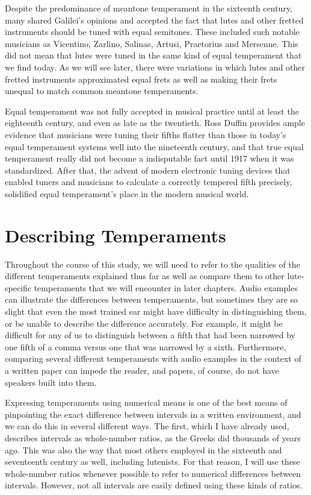 Despite the predominance of meantone temperament in the sixteenth century, many shared
Galilei's opinions and accepted the fact that lutes and other fretted instruments should
be tuned with equal semitones.  These included such notable musicians as Vicentino,
Zarlino, Salinas, Artusi, Praetorius and Mersenne. \autocite[19]{ML:1} This did not
mean that lutes were tuned in the same kind of equal temperament that we find today. As
we will see later, there were variations in which lutes and other fretted
instruments approximated equal frets as well as making their frets unequal to match
common meantone temperaments.

Equal temperament was not fully accepted in musical practice until at least the
eighteenth century, and even as late as the twentieth.  Ross Duffin provides ample
evidence that musicians were tuning their fifths flatter than those in today's equal
temperament systems well into the nineteenth century, and that true equal temperament
really did not become a indisputable fact until 1917 when it was standardized.
\autocite[138]{RD:1}  After that, the advent of modern electronic tuning devices that
enabled tuners and musicians to calculate a correctly tempered fifth precisely,
solidified equal temperament's place in the modern musical world.

\section{Describing Temperaments}

Throughout the course of this study, we will need to refer to the qualities of the different
temperaments explained thus far as well as compare them to other lute-specific temperaments that we
will encounter in later chapters.  Audio examples can illustrate the differences between
temperaments, but sometimes they are so slight that even the most trained ear might have difficulty
in distinguishing them, or be unable to describe the difference accurately. For example, it might be
difficult for any of us to distinguish between a fifth that had been narrowed by one fifth of a
comma versus one that was narrowed by a sixth.  Furthermore, comparing several different
temperaments with audio examples in the context of a written paper can impede the reader, and
papers, of course, do not have speakers built into them.

Expressing temperaments using numerical means is one of the best means of pinpointing the exact
difference between intervals in a written environment, and we can do this in several different ways.
The first, which I have already used, describes intervals as whole-number ratios, as the Greeks did
thousands of years ago.  This was also the way that most others employed in the sixteenth and
seventeenth century as well, including lutenists.  For that reason, I will use these whole-number
ratios whenever possible to refer to numerical differences between intervals. However, not all
intervals are easily defined using these kinds of ratios.

